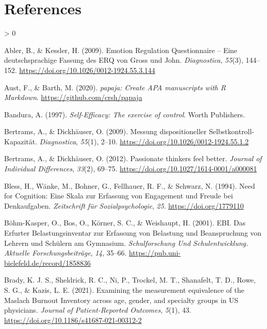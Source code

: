 \documentclass[
  english,
  man,floatsintext]{apa6}
\newlength{\cslhangindent}
\newenvironment{CSLReferences}[2] %
 {%
  \setlength{\parindent}{0pt}
  \ifodd #1 \everypar{\setlength{\hangindent}{\cslhangindent}}\ignorespaces\fi
  \ifnum #2 > 0
  \setlength{\parskip}{#2\baselineskip}
  \fi
 }%
 {}
\begin{document}
\newpage

\hypertarget{references}{%
\section{References}\label{references}}

\begingroup
\setlength{\parindent}{-0.5in}
\setlength{\leftskip}{0.5in}

\hypertarget{refs}{}
\begin{CSLReferences}{1}{0}
\leavevmode\hypertarget{ref-Abler2009}{}%
Abler, B., \& Kessler, H. (2009). Emotion {Regulation} {Questionnaire} -- {Eine} deutschsprachige {Fassung} des {ERQ} von {Gross} und {John}. \emph{Diagnostica}, \emph{55}(3), 144--152. \url{https://doi.org/10.1026/0012-1924.55.3.144}

\leavevmode\hypertarget{ref-Aust2020}{}%
Aust, F., \& Barth, M. (2020). \emph{{papaja}: {Create} {APA} manuscripts with {R Markdown}}. \url{https://github.com/crsh/papaja}

\leavevmode\hypertarget{ref-Bandura1997}{}%
Bandura, A. (1997). \emph{Self-{Efficacy}: {The} exercise of control}. Worth Publishers.

\leavevmode\hypertarget{ref-Bertrams2009a}{}%
Bertrams, A., \& Dickhäuser, O. (2009). Messung dispositioneller {Selbstkontroll}-{Kapazität}. \emph{Diagnostica}, \emph{55}(1), 2--10. \url{https://doi.org/10.1026/0012-1924.55.1.2}

\leavevmode\hypertarget{ref-Bertrams2012}{}%
Bertrams, A., \& Dickhäuser, O. (2012). Passionate thinkers feel better. \emph{Journal of Individual Differences}, \emph{33}(2), 69--75. \url{https://doi.org/10.1027/1614-0001/a000081}

\leavevmode\hypertarget{ref-Bless1994}{}%
Bless, H., Wänke, M., Bohner, G., Fellhauer, R. F., \& Schwarz, N. (1994). Need for {Cognition}: {Eine} {Skala} zur {Erfassung} von {Engagement} und {Freude} bei {Denkaufgaben}. \emph{Zeitschrift für Sozialpsychologie}, \emph{25}. \url{https://doi.org/1779110}

\leavevmode\hypertarget{ref-BoehmKasper2001}{}%
Böhm-Kasper, O., Bos, O., Körner, S. C., \& Weishaupt, H. (2001). {EBI}. {Das} {Erfurter} {Belastungsinventar} zur {Erfassung} von {Belastung} und {Beanspruchung} von {Lehrern} und {Schülern} am {Gymnasium}. \emph{Schulforschung Und Schulentwicklung. Aktuelle Forschungsbeiträge}, \emph{14}, 35--66. \url{https://pub.uni-bielefeld.de/record/1858836}

\leavevmode\hypertarget{ref-Brady2021}{}%
Brady, K. J. S., Sheldrick, R. C., Ni, P., Trockel, M. T., Shanafelt, T. D., Rowe, S. G., \& Kazis, L. E. (2021). Examining the measurement equivalence of the {Maslach} {Burnout} {Inventory} across age, gender, and specialty groups in {US} physicians. \emph{Journal of Patient-Reported Outcomes}, \emph{5}(1), 43. \url{https://doi.org/10.1186/s41687-021-00312-2}


\end{CSLReferences}
\end{document}

